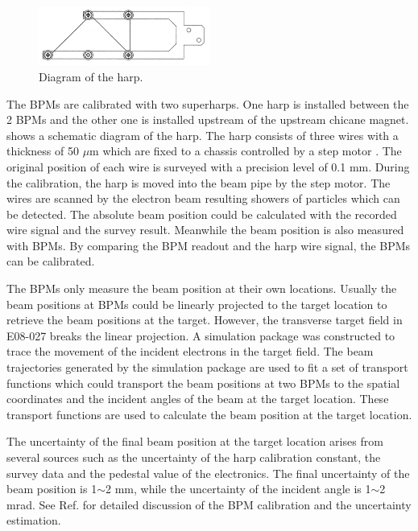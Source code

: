 \begin{figure}[tb!]
  \centering
  \includegraphics[width=0.5\textwidth]{figs/harp.png}
  \caption[Diagram of the harp.]{Diagram of the harp. \label{C5S2SS3F2}}
\end{figure}

The BPMs are calibrated with two superharps. One harp is installed between the 2 BPMs and the other one is installed upstream of the upstream chicane magnet.  shows a schematic diagram of the harp. The harp consists of three wires with a thickness of 50 $\mu$m which are fixed to a chassis controlled by a step motor \cite{Yan1995}. The original position of each wire is surveyed with a precision level of 0.1 mm. During the calibration, the harp is moved into the beam pipe by the step motor. The wires are scanned by the electron beam resulting showers of particles which can be detected. The absolute beam position could be calculated with the recorded wire signal and the survey result. Meanwhile the beam position is also measured with BPMs. By comparing the BPM readout and the harp wire signal, the BPMs can be calibrated.

The BPMs only measure the beam position at their own locations. Usually the beam positions at BPMs could be linearly projected to the target location to retrieve the beam positions at the target. However, the transverse target field in E08-027 breaks the linear projection. A simulation package was constructed to trace the movement of the incident electrons in the target field. The beam trajectories generated by the simulation package are used to fit a set of transport functions which could transport the beam positions at two BPMs to the spatial coordinates and the incident angles of the beam at the target location. These transport functions are used to calculate the beam position at the target location.

The uncertainty of the final beam position at the target location arises from several sources such as the uncertainty of the harp calibration constant, the survey data and the pedestal value of the electronics. The final uncertainty of the beam position is 1$\sim$2 mm, while the uncertainty of the incident angle is 1$\sim$2 mrad. See Ref. \cite{Zhu2014} for detailed discussion of the BPM calibration and the uncertainty estimation.

